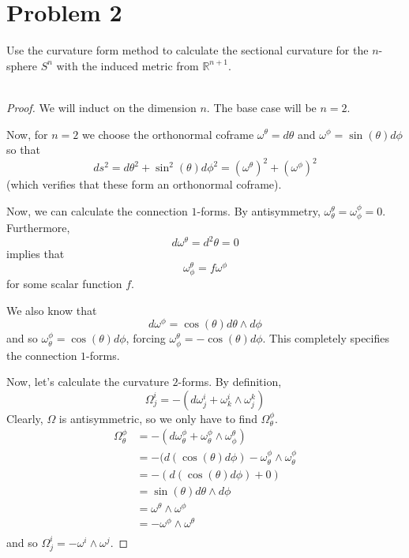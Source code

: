 \documentclass[fontsize=11pt]{scrartcl} %
\numberwithin{equation}{section} %
\numberwithin{figure}{section} %
\numberwithin{table}{section} %
\newcommand{\R}{\mathbb{R}}
\begin{document}
\section*{Problem 2}
Use the curvature form method to calculate the sectional curvature for the
$n$-sphere $S^n$ with the induced metric from $\R^{n+1}$.
\\
\\
\begin{proof}
    We will induct on the dimension $n$.
    The base case will be $n=2$.

    Now, for $n=2$ we choose the orthonormal coframe $\omega^{\theta} =
    d\theta$ and $\omega^{\phi} = \sin(\theta)d\phi$ so that
    \[
        ds^2 = d\theta^2 + \sin^2(\theta)d\phi^2 = (\omega^{\theta})^2 +
        (\omega^{\phi})^2
    \]
    (which verifies that these form an orthonormal coframe).

    Now, we can calculate the connection $1$-forms. By antisymmetry,
    $\omega^{\theta}_{\theta} = \omega^{\phi}_{\phi} = 0$. Furthermore,
    \[
        d\omega^{\theta} = d^2\theta = 0
    \]
    implies that
    \[
        \omega^{\theta}_{\phi} = f\omega^{\phi}
    \]
    for some scalar function $f$.

    We also know that
    \[
        d\omega^{\phi} = \cos(\theta)d\theta\wedge d\phi
    \]
    and so $\omega^{\phi}_{\theta} = \cos(\theta)d\phi$, forcing
    $\omega^{\theta}_{\phi} = -\cos(\theta)d\phi$. This completely specifies the
    connection $1$-forms.

    Now, let's calculate the curvature $2$-forms. By definition,
    \[
        \Omega^i_j = -(d\omega^i_j + \omega^i_k\wedge\omega^k_j)
    \]
    Clearly, $\Omega$ is antisymmetric, so we only have to find
    $\Omega^{\phi}_{\theta}$.
    \[
        \begin{aligned}
            \Omega^{\phi}_{\theta} &= -(d\omega^{\phi}_{\theta} +
            \omega^{\phi}_{\theta}\wedge\omega^{\theta}_{\phi})\\
            &= -(d(\cos(\theta)d\phi) -
                \omega^{\phi}_{\theta}\wedge\omega^{\phi}_{\theta}\\
                &= -(d(\cos(\theta)d\phi) + 0)\\
                &= \sin(\theta)d\theta\wedge d\phi\\
                &= \omega^{\theta}\wedge\omega^{\phi}\\
                &=-\omega^{\phi}\wedge\omega^{\theta}\\
        \end{aligned}
    \]
    and so $\Omega^i_j = -\omega^i\wedge\omega^j$. 
    

\end{proof}
\end{document}
